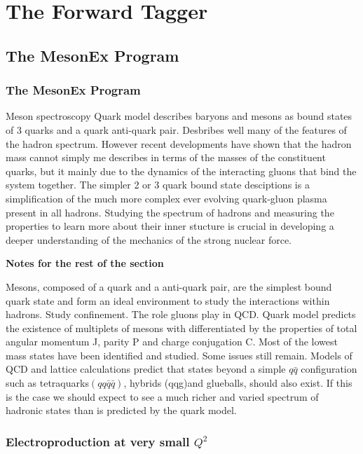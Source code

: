 \chapter{The Forward Tagger}

\section{The MesonEx Program}

\subsection{The MesonEx Program}
Meson spectroscopy
Quark model describes baryons and mesons as bound states of 3 quarks and a quark anti-quark pair. Desbribes well many of the features of the hadron spectrum. However recent developments have shown that the hadron mass cannot simply me describes in terms of the masses of the constituent quarks, but it mainly due to the dynamics of the interacting gluons that bind the system together. The simpler 2 or 3 quark bound state desciptions is a simplification of the much more complex ever evolving quark-gluon plasma present in all hadrons. Studying the spectrum of hadrons and measuring the properties to learn more about their inner stucture is crucial in developing a deeper understanding of the mechanics of the strong nuclear force.


\textbf{Notes for the rest of the section} 

Mesons, composed of a quark and a anti-quark pair, are the simplest bound quark state and form an ideal environment to study the interactions within hadrons. 
Study confinement.
The role gluons play in QCD.
Quark model predicts the existence of multiplets of mesons with differentiated by the properties of total angular momentum J, parity P and charge conjugation C.
Most of the lowest mass states have been identified and studied.
Some issues still remain.
Models of QCD and lattice calculations predict that states beyond a simple $q\bar{q}$ configuration such as tetraquarks$(qq\bar{q}\bar{q})$, hybrids (qqg)and glueballs, should also exist.
If this is the case we should expect to see a much richer and varied spectrum of hadronic states than is predicted by the quark model.

\subsection{Electroproduction at very small $Q^2$}


